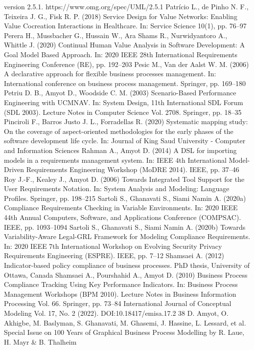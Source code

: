 version 2.5.1. https://www.omg.org/spec/UML/2.5.1
Patrício L., de Pinho N. F., Teixeira J. G., Fisk
R. P. (2018) Service Design for Value Networks:
Enabling Value Cocreation Interactions in Healthcare. In: Service Science 10(1), pp. 76–97
Perera H., Mussbacher G., Hussain W., Ara Shams
R., Nurwidyantoro A., Whittle J. (2020) Continual
Human Value Analysis in Software Development:
A Goal Model Based Approach. In: 2020 IEEE
28th International Requirements Engineering Conference (RE), pp. 192–203
Pesic M., Van der Aalst W. M. (2006) A declarative
approach for flexible business processes management. In: International conference on business
process management. Springer, pp. 169–180
Petriu D. B., Amyot D., Woodside C. M. (2003)
Scenario-Based Performance Engineering with
UCMNAV. In: System Design, 11th International
SDL Forum (SDL 2003). Lecture Notes in Computer Science Vol. 2708. Springer, pp. 18–35
Pinciroli F., Barros Justo J. L., Forradellas R.
(2020) Systematic mapping study: On the coverage
of aspect-oriented methodologies for the early
phases of the software development life cycle. In:
Journal of King Saud University - Computer and
Information Sciences
Rahman A., Amyot D. (2014) A DSL for importing models in a requirements management
system. In: IEEE 4th International Model-Driven
Requirements Engineering Workshop (MoDRE
2014). IEEE, pp. 37–46
Roy J.-F., Kealey J., Amyot D. (2006) Towards Integrated Tool Support for the User Requirements
Notation. In: System Analysis and Modeling: Language Profiles. Springer, pp. 198–215
Sartoli S., Ghanavati S., Siami Namin A. (2020a)
Compliance Requirements Checking in Variable
Environments. In: 2020 IEEE 44th Annual Computers, Software, and Applications Conference
(COMPSAC). IEEE, pp. 1093–1094
Sartoli S., Ghanavati S., Siami Namin A. (2020b)
Towards Variability-Aware Legal-GRL Framework for Modeling Compliance Requirements. In:
2020 IEEE 7th International Workshop on Evolving Security Privacy Requirements Engineering
(ESPRE). IEEE, pp. 7–12
Shamsaei A. (2012) Indicator-based policy compliance of business processes. PhD thesis, University
of Ottawa, Canada
Shamsaei A., Pourshahid A., Amyot D. (2010)
Business Process Compliance Tracking Using
Key Performance Indicators. In: Business Process
Management Workshops (BPM 2010). Lecture
Notes in Business Information Processing Vol. 66.
Springer, pp. 73–84
International Journal of Conceptual Modeling
Vol. 17, No. 2 (2022). DOI:10.18417/emisa.17.2
38 D. Amyot, O. Akhigbe, M. Baslyman, S. Ghanavati, M. Ghasemi, J. Hassine, L. Lessard, et al.
Special Issue on 100 Years of Graphical Business Process Modelling by R. Laue, H. Mayr & B. Thalheim
